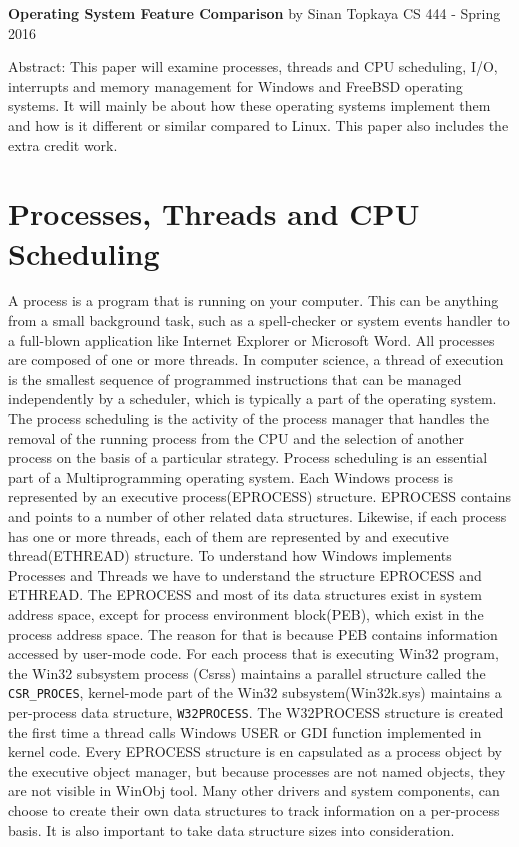 \documentclass[letterpaper,10pt,draftclsnofoot,onecolumn]{IEEEtran}
\begin{document}
	\begin{titlepage}
		
		\begin{center}
		\bigbreak	
		\textbf{Operating System Feature Comparison}
		\bigbreak
		by Sinan Topkaya
		\smallbreak
		CS 444 - Spring 2016
		\end{center}
		\vfill
		
		Abstract: This paper will examine processes, threads and CPU scheduling, I/O, interrupts and memory management for Windows and FreeBSD operating systems. It will mainly be about how these operating systems implement them and how is it different or similar compared to Linux. This paper also includes the extra credit work.
		
	\end{titlepage}

\section*{Processes, Threads and CPU Scheduling}
A process is a program that is running on your computer. This can be anything from a small background task, such as a spell-checker or system events handler to a full-blown application like Internet Explorer or Microsoft Word. All processes are composed of one or more threads. In computer science, a thread of execution is the smallest sequence of programmed instructions that can be managed independently by a scheduler, which is typically a part of the operating system. The process scheduling is the activity of the process manager that handles the removal of the running process from the CPU and the selection of another process on the basis of a particular strategy. Process scheduling is an essential part of a Multiprogramming operating system.
Each Windows process is represented by an executive process(EPROCESS) structure. EPROCESS contains and points to a number of other related data structures. Likewise, if each process has one or more threads, each of them are represented by and executive thread(ETHREAD) structure. To understand how Windows implements Processes and Threads we have to understand the structure EPROCESS and ETHREAD. 
The EPROCESS and most of its data structures exist in system address space, except for process environment block(PEB), which exist in the process address space. The reason for that is because PEB contains information accessed by user-mode code. For each process that is executing Win32 program, the Win32 subsystem process (Csrss) maintains a parallel structure called the \verb|CSR_PROCES|, kernel-mode part of the Win32 subsystem(Win32k.sys) maintains a per-process data structure, \verb|W32PROCESS|. The W32PROCESS structure is created the first time a thread calls Windows USER or GDI function implemented in kernel code. Every EPROCESS structure is en capsulated as a process object by the executive object manager, but because processes are not named objects, they are not visible in WinObj tool. Many other drivers and system components, can choose to create their own data structures to track information on a per-process basis. It is also important to take data structure sizes into consideration.\cite{[1]}
\end{document}
